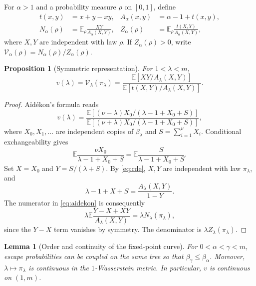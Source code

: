 \documentclass[11pt,a4paper]{article}
\numberwithin{equation}{section}
\theoremstyle{notethm}
\newtheorem{proposition}[proposition]{Proposition}
\newtheorem{lemma}[lemma]{Lemma}
\theoremstyle{definition}
\newcommand{\E}{\mathbb E}
\begin{document}
For $\alpha>1$ and a probability measure $\rho$ on $[0,1]$, define
\begin{align}
 t(x,y)&=x+y-xy,
 & A_\alpha(x,y)&=\alpha-1+t(x,y),\label{eq:kernels}\\
 N_\alpha(\rho)&=\E_\rho\frac{XY}{A_\alpha(X,Y)},
 & Z_\alpha(\rho)&=\E_\rho\frac{t(X,Y)}{A_\alpha(X,Y)},\label{eq:NZ}
\end{align}
where $X,Y$ are independent with law $\rho$. If $Z_\alpha(\rho)>0$, write
$\mathcal V_\alpha(\rho)=N_\alpha(\rho)/Z_\alpha(\rho)$.

\begin{proposition}[Symmetric representation]\label{prop:symmetric}
For $1<\lambda<m$,
\begin{equation}\label{eq:symmetric-speed}
 v(\lambda)=\mathcal V_\lambda(\pi_\lambda)
 =\frac{\E[XY/A_\lambda(X,Y)]}
       {\E[t(X,Y)/A_\lambda(X,Y)]}.
\end{equation}
\end{proposition}

\begin{proof}
A\"id\'ekon's formula \cite[Theorem~1.1]{Aidekon} reads
\begin{equation}\label{eq:aidekon}
 v(\lambda)=
 \frac{\E[(\nu-\lambda)X_0/(\lambda-1+X_0+S)]}
      {\E[(\nu+\lambda)X_0/(\lambda-1+X_0+S)]},
\end{equation}
where $X_0,X_1,\ldots$ are independent copies of $\beta_\lambda$ and
$S=\sum_{i=1}^{\nu}X_i$. Conditional exchangeability gives
\begin{equation}\label{eq:exchange-speed}
 \E\frac{\nu X_0}{\lambda-1+X_0+S}
 =\E\frac{S}{\lambda-1+X_0+S}.
\end{equation}
Set $X=X_0$ and $Y=S/(\lambda+S)$. By \eqref{eq:rde}, $X,Y$ are independent
with law $\pi_\lambda$, and
\begin{equation}\label{eq:denom-change}
 \lambda-1+X+S=\frac{A_\lambda(X,Y)}{1-Y}.
\end{equation}
The numerator in \eqref{eq:aidekon} is consequently
\[
 \lambda\E\frac{Y-X+XY}{A_\lambda(X,Y)}
 =\lambda N_\lambda(\pi_\lambda),
\]
since the $Y-X$ term vanishes by symmetry. The denominator is
$\lambda Z_\lambda(\pi_\lambda)$.
\end{proof}

\begin{lemma}[Order and continuity of the fixed-point curve]\label{lem:continuity}
For $0<\alpha<\gamma<m$, escape probabilities can be coupled on the same tree
so that $\beta_\gamma\le\beta_\alpha$. Moreover,
$\lambda\mapsto\pi_\lambda$ is continuous in the $1$-Wasserstein metric.
In particular, $v$ is continuous on $(1,m)$.
\end{lemma}
\end{document}
